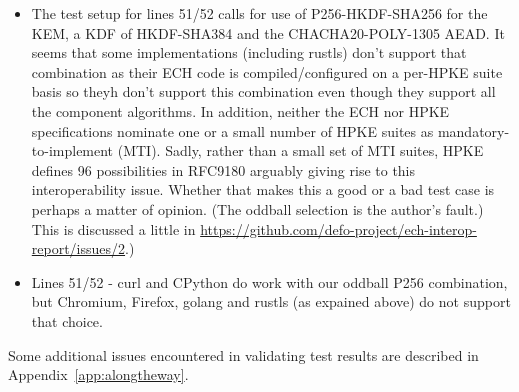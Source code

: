 \begin{itemize}
    \item The test setup for lines 51/52 calls for use of P256-HKDF-SHA256 for
        the KEM, a KDF of HKDF-SHA384 and the CHACHA20-POLY-1305 AEAD.  It
        seems that some implementations (including rustls) don't support that
        combination as their ECH code is compiled/configured on a per-HPKE suite basis
        so theyh don't support this combination even though they support all the
        component algorithms.  In addition, neither the ECH nor HPKE
        specifications nominate one or a small number of HPKE suites as
        mandatory-to-implement (MTI).  Sadly, rather than a small set of MTI
        suites, HPKE defines 96 possibilities in RFC9180 \cite{rfc9180}
        arguably giving rise to this interoperability issue.  Whether that
        makes this a good or a bad test case is perhaps a matter of opinion.
        (The oddball selection is the author's fault.) This is discussed a
        little in
        \url{https://github.com/defo-project/ech-interop-report/issues/2}.)

    \item Lines 51/52 - curl and CPython do work with our oddball P256
        combination, but Chromium, Firefox, golang and rustls (as expained above)
        do not support that choice.

\end{itemize}

Some additional issues encountered in validating test results are described
in Appendix~\ref{app:alongtheway}.

